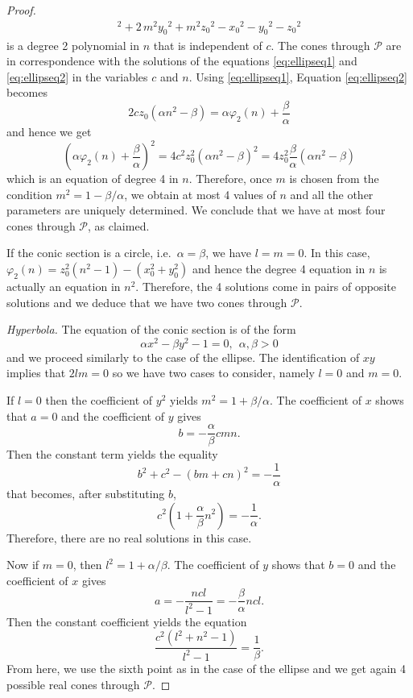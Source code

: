 \documentclass[5p]{elsarticle}
\newcommand\Pc{\mathcal P}
\newcommand{\com}[1]{{\color{black} #1}}
\begin{document}
\begin{proof}
\begin{multline*}
  ^{2}+2\,{m}^{2}{y_0}^{2}+{m}^{2}{z_0}^{2}-{x_0}^{2}-{y_0}^{2}-{z_0}^{2}	
\end{multline*}
is a degree 2 polynomial in $n$ \com{that} is independent of $c$. The cones through $\Pc$ are in correspondence with the solutions of the equations \eqref{eq:ellipseq1} and \eqref{eq:ellipseq2} in the variables $c$ and $n$. Using \eqref{eq:ellipseq1}, Equation \eqref{eq:ellipseq2} becomes
$$ 2cz_0\left(\alpha{n}^{2} -\beta \right)=\alpha \varphi_2(n)+\frac{\beta}{\alpha}$$
and hence we get
$$ \left( \alpha \varphi_2(n)+\frac{\beta}{\alpha}   \right)^2=4c^2z_0^2(\alpha{n}^{2} -\beta)^2= 
4z_0^2\frac{\beta}{\alpha}(\alpha{n}^{2} -\beta)
$$
which is an equation of degree 4 in $n$. Therefore, once $m$ is chosen from the condition $m^2=1-\beta/\alpha$, we obtain at most 4 values of $n$ and all the \com{other} parameters are uniquely determined. We conclude that we have at most four cones through $\Pc$, as claimed. 

If the conic section is a circle, i.e.~$\alpha=\beta$, we have $l=m=0$. In this case, $\varphi_2(n)=z_0^2(n^2-1)-(x_0^2+y_0^2)$ and hence the degree 4 equation in $n$ is actually an equation in $n^2$. Therefore, the 4 solutions \com{come in} pairs of opposite solutions and we deduce that we have two cones through $\Pc$.

\medskip	
	
\noindent \textit{Hyperbola.} The equation of the conic section is of the form   
	$$\alpha x^2 - \beta y^2 -1 =0, \ \ \alpha,\beta > 0$$
and we proceed similarly to the case of the ellipse. The identification of $xy$ implies that $2lm=0$ so we have \com{two} cases to consider, namely $l=0$ and $m=0$. 

If $l=0$ then the coefficient of $y^2$ yields $m^2=1+\beta/\alpha$. The coefficient of $x$ shows that $a=0$ and the coefficient of $y$ gives
$$b=-\frac{\alpha}{\beta}cmn.$$ 
\com{Then} the constant term yields the equality
$$b^2+c^2-(bm+cn)^2=-\frac{1}{\alpha}$$
\com{that} becomes, after \com{substituting} $b$, 
$$c^2\left(1+\frac{\alpha}{\beta}n^2\right)=-\frac{1}{\alpha}.$$
Therefore, there are no real solutions in this case. 

\com{Now} if $m=0$, then $l^2=1+\alpha/\beta$. \com{The} coefficient of $y$ shows that $b=0$ and the coefficient of $x$ gives
$$a=-\frac{ncl}{l^2-1}=-\frac{\beta}{\alpha}ncl.$$   	
\com{Then} the constant coefficient yields the equation
$$\frac{c^2( l^2+n^2-1)}{l^2-1}=\frac{1}{\beta}.
$$ 
From here, we use the sixth point as in the case of the ellipse and we get again 4 possible real cones through $\Pc$.


\end{proof}
\end{document}
